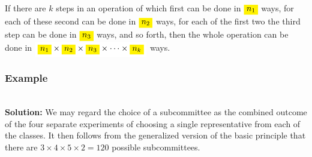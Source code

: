 \documentclass[compress]{beamer}
\newcommand{\sqBullet}[1]{  {\tiny \tiny \tiny \qBoxCol{#1!60}{ }} }
\begin{document}
\begin{frame}
\begin{defn}
If there are $k$ steps in an operation of which first can be done in $\HLTY{n_1}$ ways,
for each of these second can be done in $\HLTY{n_2}$ ways, for each of
the first two the third step can be done in $\HLTY{n_3}$ ways, and so
forth, then the whole operation can be done in
$\HLTW{\HLTY{n_1} \times \HLTY{n_2} \times \HLTY{ n_3} \times \cdots  \times  \HLTY{n_k}}$ ways.
\end{defn}	
	\vspace{.5in}
	
%	
	
	\vspace{2in}
\end{frame}




\begin{frame}
	\frametitle{Example }
\\
\pause
\vspace{.5in}
{\tiny {\bf Solution:} We may regard the choice of a subcommittee as the combined outcome of the four separate
experiments of choosing a single representative from each of the classes. It then follows from the generalized version of the basic principle that there are $3\times 4\times 5\times 2 = 120$ possible subcommittees.}
\vspace{2in}

\end{frame}
\end{document}
